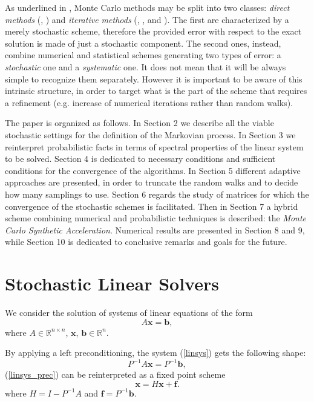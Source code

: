 \documentclass[a4paper,10pt]{article}
\begin{document}
As underlined in \cite{DA1998}, Monte Carlo methods may be split into two
classes: \textit{direct methods} (\cite{DA1998}, \cite{DVA2001}) and
\textit{iterative methods} (\cite{Hal1962},
\cite{Hal1994}, \cite{ESW2013}
and \cite{EMSH2014}). The first are characterized by a merely stochastic
scheme,
therefore the provided error with respect to the exact solution is made of
just a stochastic component. The second ones, instead, combine numerical and
statistical schemes generating two types of error: a
\textit{stochastic} one and a \textit{systematic} one. It does not
mean
that
it will be always simple to recognize them separately. However it is important
to
be
aware of this intrinsic structure, in order to target what is the part of the
scheme that requires a refinement (e.g. increase of numerical iterations
rather than random walks).\newline

The paper is organized as follows. In Section 2 we describe all the
viable stochastic settings for the definition of the Markovian process. In
Section 3 we reinterpret probabilistic facts in terms of spectral properties of
the linear system to be solved. Section 4 is dedicated to necessary conditions
and sufficient conditions for the convergence of the algorithms. In Section 5
different adaptive approaches are presented, in order to truncate the random
walks and to decide how many samplings to use. Section 6 regards the study
of matrices for which the convergence of the stochastic schemes is facilitated.
Then in Section 7 a hybrid scheme combining numerical and probabilistic
techniques is described: the \textit{Monte Carlo Synthetic Acceleration}.
Numerical results are presented in Section 8 and 9, while Section 10 is
dedicated to
conclusive remarks and goals for the future.

\section{Stochastic Linear Solvers}

We consider the solution of systems of linear equations of the form
\begin{equation}
A \mathbf{x}=\mathbf{b},
\label{linsys}
\end{equation}
where $A\in \mathbb{R}^{n\times n}$, $\mathbf{x}$, $\mathbf{b} \in
\mathbb{R}^n$.

By applying a left preconditioning, the system (\ref{linsys}) gets the
following shape:
\begin{equation}
P^{-1}A \mathbf{x}=P^{-1}\mathbf{b},
\label{linsys_prec}
\end{equation}
(\ref{linsys_prec}) can be
reinterpreted as a fixed point scheme
\begin{equation}
 \mathbf{x}=H\mathbf{x}+\mathbf{f}.
 \label{fixedpoint}
\end{equation}
where $H=I-P^{-1}A$ and $\mathbf{f}=P^{-1}\mathbf{b}$.
\end{document}
